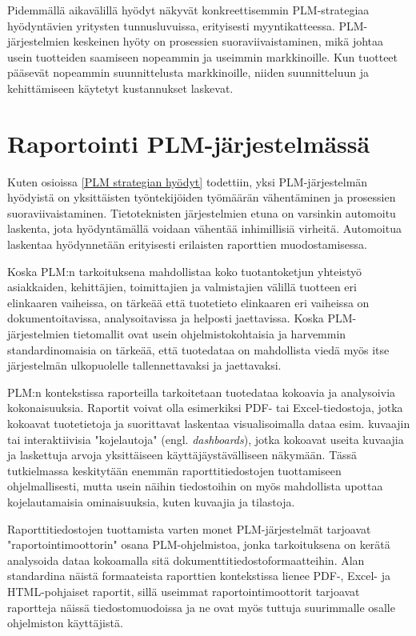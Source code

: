 Pidemmällä aikavälillä hyödyt näkyvät konkreettisemmin PLM-strategiaa hyödyntävien yritysten tunnusluvuissa, erityisesti myyntikatteessa. PLM-järjestelmien keskeinen hyöty on prosessien suoraviivaistaminen, mikä johtaa usein tuotteiden saamiseen nopeammin ja useimmin markkinoille. Kun tuotteet pääsevät nopeammin suunnittelusta markkinoille, niiden suunnitteluun ja kehittämiseen käytetyt kustannukset laskevat.  \cite{bouhaddou_plm_2012}  \cite{alemanni_key_2008}

\section{Raportointi PLM-järjestelmässä} \label{Raportointi PLM-järjestelmässä}

Kuten osioissa \ref{PLM strategian hyödyt} todettiin, yksi PLM-järjestelmän hyödyistä on yksittäisten työntekijöiden työmäärän vähentäminen ja prosessien suoraviivaistaminen. Tietoteknisten järjestelmien etuna on varsinkin automoitu laskenta, jota hyödyntämällä voidaan vähentää inhimillisiä virheitä. \cite{niu_organizational_2021} \cite{rakovic_digital_2022} Automoitua laskentaa hyödynnetään erityisesti erilaisten raporttien muodostamisessa.

Koska PLM:n tarkoituksena mahdollistaa koko tuotantoketjun yhteistyö asiakkaiden, kehittäjien, toimittajien ja valmistajien välillä tuotteen eri elinkaaren vaiheissa,  \cite{bouhaddou_plm_2012} on tärkeää että tuotetieto elinkaaren eri vaiheissa on dokumentoitavissa, analysoitavissa ja helposti jaettavissa. Koska PLM-järjestelmien tietomallit ovat usein ohjelmistokohtaisia ja harvemmin standardinomaisia  \cite{SritiMohamed-Foued2012PTaS} on tärkeää, että tuotedataa on mahdollista viedä myös itse järjestelmän ulkopuolelle tallennettavaksi ja jaettavaksi.

PLM:n kontekstissa raporteilla tarkoitetaan tuotedataa kokoavia ja analysoivia kokonaisuuksia. Raportit voivat olla esimerkiksi PDF- tai Excel-tiedostoja, jotka kokoavat tuotetietoja ja suorittavat laskentaa visualisoimalla dataa esim. kuvaajin tai interaktiivisia "kojelautoja" (engl. \textit{dashboards}), jotka kokoavat useita kuvaajia ja laskettuja arvoja yksittäiseen käyttäjäystävälliseen näkymään. Tässä tutkielmassa keskitytään enemmän raporttitiedostojen tuottamiseen ohjelmallisesti, mutta usein näihin tiedostoihin on myös mahdollista upottaa kojelautamaisia ominaisuuksia, kuten kuvaajia ja tilastoja.

Raporttitiedostojen tuottamista varten monet PLM-järjestelmät tarjoavat "raportointimoottorin" osana PLM-ohjelmistoa, jonka tarkoituksena on kerätä analysoida dataa kokoamalla sitä dokumenttitiedostoformaatteihin. Alan standardina näistä formaateista raporttien kontekstissa lienee PDF-, Excel- ja HTML-pohjaiset raportit, sillä useimmat raportointimoottorit tarjoavat raportteja näissä tiedostomuodoissa ja ne ovat myös tuttuja suurimmalle osalle ohjelmiston käyttäjistä. 

